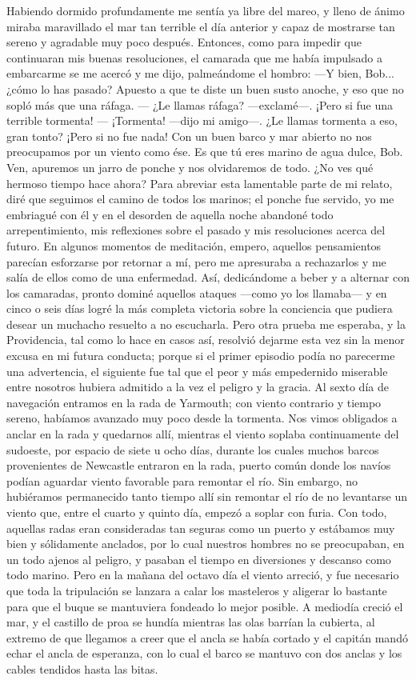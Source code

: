 \documentclass{novela}
\begin{document}
    Habiendo dormido profundamente me sentía ya libre del mareo, y lleno de ánimo miraba maravillado el mar tan terrible el día anterior y capaz de mostrarse tan sereno y agradable muy poco después. Entonces, como para impedir que continuaran mis buenas resoluciones, el camarada que me había impulsado a embarcarme se me acercó y me dijo, palmeándome el hombro:
    —Y bien, Bob... ¿cómo lo has pasado? Apuesto a que te diste un buen susto anoche, y eso que no sopló más que una ráfaga.
    — ¿Le llamas ráfaga? —exclamé—. ¡Pero si fue una terrible tormenta!
    — ¡Tormenta! —dijo mi amigo—. ¿Le llamas tormenta a eso, gran tonto? ¡Pero si no fue nada! Con un buen barco y mar abierto no nos preocupamos por un viento como ése. Es que tú eres marino de agua dulce, Bob. Ven, apuremos un jarro de ponche y nos olvidaremos de todo. ¿No ves qué hermoso tiempo hace ahora?
    Para abreviar esta lamentable parte de mi relato, diré que seguimos el camino de todos los marinos; el ponche fue servido, yo me embriagué con él y en el desorden de aquella noche abandoné todo arrepentimiento, mis reflexiones sobre el pasado y mis resoluciones acerca del futuro. En algunos momentos de meditación, empero, aquellos pensamientos parecían esforzarse por retornar a mí, pero me apresuraba a rechazarlos y me salía de ellos como de una enfermedad. Así, dedicándome a beber y a alternar con los camaradas, pronto dominé aquellos ataques —como yo los llamaba— y en cinco o seis días logré la más completa victoria sobre la conciencia que pudiera desear un muchacho resuelto a no escucharla. Pero otra prueba me esperaba, y la Providencia, tal como lo hace en casos así, resolvió dejarme esta vez sin la menor excusa en mi futura conducta; porque si el primer episodio podía no parecerme una advertencia, el siguiente fue tal que el peor y más empedernido miserable entre nosotros hubiera admitido a la vez el peligro y la gracia.
    Al sexto día de navegación entramos en la rada de Yarmouth; con viento contrario y tiempo sereno, habíamos avanzado muy poco desde la tormenta. Nos vimos obligados a anclar en la rada y quedarnos allí, mientras el viento soplaba continuamente del sudoeste, por espacio de siete u ocho días, durante los cuales muchos barcos provenientes de Newcastle entraron en la rada, puerto común donde los navíos podían aguardar viento favorable para remontar el río.
    Sin embargo, no hubiéramos permanecido tanto tiempo allí sin remontar el río de no levantarse un viento que, entre el cuarto y quinto día, empezó a soplar con furia. Con todo, aquellas radas eran consideradas tan seguras como un puerto y estábamos muy bien y sólidamente anclados, por lo cual nuestros hombres no se preocupaban, en un todo ajenos al peligro, y pasaban el tiempo en diversiones y descanso como todo marino. Pero en la mañana del octavo día el viento arreció, y fue necesario que toda la tripulación se lanzara a calar los masteleros y aligerar lo bastante para que el buque se mantuviera fondeado lo mejor posible. A mediodía creció el mar, y el castillo de proa se hundía mientras las olas barrían la cubierta, al extremo de que llegamos a creer que el ancla se había cortado y el capitán mandó echar el ancla de esperanza, con lo cual el barco se mantuvo con dos anclas y los cables tendidos hasta las bitas.
\end{document}
